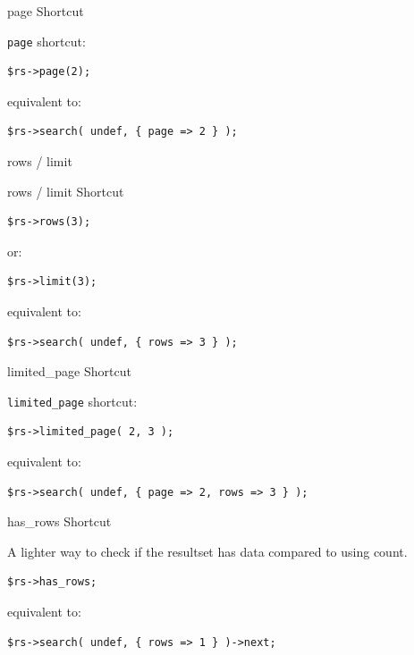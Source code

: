 \begin{frame}[fragile]{page Shortcut}

\verb|page| shortcut:

\begin{lstlisting}
$rs->page(2);
\end{lstlisting}

equivalent to:

\begin{lstlisting}
$rs->search( undef, { page => 2 } );
\end{lstlisting}

\end{frame}

rows / limit

\begin{frame}[fragile]{rows / limit Shortcut}

\begin{lstlisting}
$rs->rows(3);
\end{lstlisting}

or:

\begin{lstlisting}
$rs->limit(3);
\end{lstlisting}

equivalent to:

\begin{lstlisting}
$rs->search( undef, { rows => 3 } );
\end{lstlisting}

\end{frame}

\begin{frame}[fragile]{limited\_page Shortcut}

\verb|limited_page| shortcut:

\begin{lstlisting}
$rs->limited_page( 2, 3 );
\end{lstlisting}

equivalent to:

\begin{lstlisting}
$rs->search( undef, { page => 2, rows => 3 } );
\end{lstlisting}

\end{frame}

\begin{frame}[fragile]{has\_rows Shortcut}

A lighter way to check if the resultset has data compared to using count.

\begin{lstlisting}
$rs->has_rows;
\end{lstlisting}

equivalent to:

\begin{lstlisting}
$rs->search( undef, { rows => 1 } )->next;
\end{lstlisting}
\end{frame}

